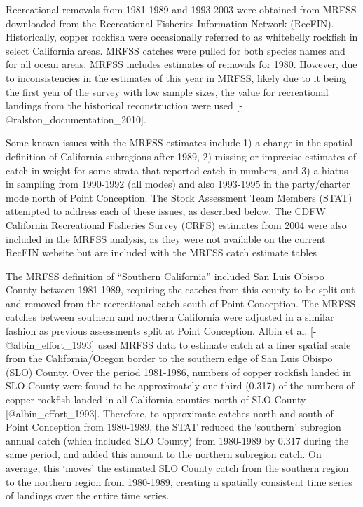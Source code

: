 \documentclass[11pt,
  letterpaper,
]{article}
\begin{document}
Recreational removals from 1981-1989 and 1993-2003 were obtained from MRFSS downloaded from the Recreational Fisheries Information Network (RecFIN). Historically, copper rockfish were occasionally referred to as whitebelly rockfish in select California areas. MRFSS catches were pulled for both species names and for all ocean areas. MRFSS includes estimates of removals for 1980. However, due to inconsistencies in the estimates of this year in MRFSS, likely due to it being the first year of the survey with low sample sizes, the value for recreational landings from the historical reconstruction were used {[}-@ralston\_documentation\_2010{]}.

Some known issues with the MRFSS estimates include 1) a change in the spatial definition of California subregions after 1989, 2) missing or imprecise estimates of catch in weight for some strata that reported catch in numbers, and 3) a hiatus in sampling from 1990-1992 (all modes) and also 1993-1995 in the party/charter mode north of Point Conception. The Stock Assessment Team Members (STAT) attempted to address each of these issues, as described below. The CDFW California Recreational Fisheries Survey (CRFS) estimates from 2004 were also included in the MRFSS analysis, as they were not available on the current RecFIN website but are included with the MRFSS catch estimate tables

The MRFSS definition of ``Southern California'' included San Luis Obispo County between 1981-1989, requiring the catches from this county to be split out and removed from the recreational catch south of Point Conception. The MRFSS catches between southern and northern California were adjusted in a similar fashion as previous assessments split at Point Conception. Albin et al. {[}-@albin\_effort\_1993{]} used MRFSS data to estimate catch at a finer spatial scale from the California/Oregon border to the southern edge of San Luis Obispo (SLO) County. Over the period 1981-1986, numbers of copper rockfish landed in SLO County were found to be approximately one third (0.317) of the numbers of copper rockfish landed in all California counties north of SLO County {[}@albin\_effort\_1993{]}. Therefore, to approximate catches north and south of Point Conception from 1980-1989, the STAT reduced the `southern' subregion annual catch (which included SLO County) from 1980-1989 by 0.317 during the same period, and added this amount to the northern subregion catch. On average, this `moves' the estimated SLO County catch from the southern region to the northern region from 1980-1989, creating a spatially consistent time series of landings over the entire time series.
\end{document}
